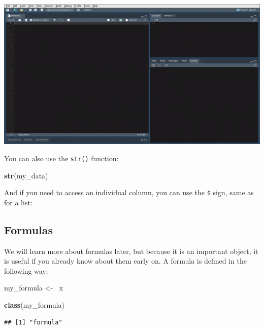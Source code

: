 \documentclass[]{gitbook}
\newenvironment{Shaded}{\begin{snugshade}}{\end{snugshade}}
\newcommand{\ErrorTok}[1]{\textcolor[rgb]{0.64,0.00,0.00}{\textbf{#1}}}
\newcommand{\KeywordTok}[1]{\textcolor[rgb]{0.13,0.29,0.53}{\textbf{#1}}}
\newcommand{\NormalTok}[1]{#1}
\newcommand{\OperatorTok}[1]{\textcolor[rgb]{0.81,0.36,0.00}{\textbf{#1}}}
\newcommand{\StringTok}[1]{\textcolor[rgb]{0.31,0.60,0.02}{#1}}
\theoremstyle{definition}
\theoremstyle{definition}
\theoremstyle{definition}
\theoremstyle{remark}
\begin{document}
\includegraphics{pics/rstudio_view_data.gif}

You can also use the \texttt{str()} function:

\begin{Shaded}
\begin{Highlighting}[]
\KeywordTok{str}\NormalTok{(my_data)}
\end{Highlighting}
\end{Shaded}

And if you need to access an individual column, you can use the
\texttt{\$} sign, same as for a list:

\begin{Shaded}
\end{Shaded}

\hypertarget{formulas}{%
\subsection{Formulas}\label{formulas}}

We will learn more about formulas later, but because it is an important
object, it is useful if you already know about them early on. A formula
is defined in the following way:

\begin{Shaded}
\begin{Highlighting}[]
\NormalTok{my_formula <-}\StringTok{ }\ErrorTok{~}\NormalTok{x}

\KeywordTok{class}\NormalTok{(my_formula)}
\end{Highlighting}
\end{Shaded}

\begin{verbatim}
## [1] "formula"
\end{verbatim}
\end{document}

